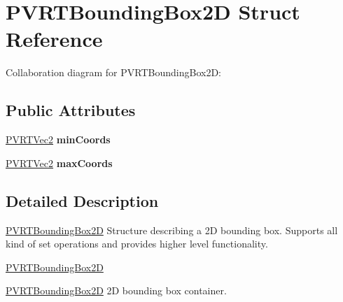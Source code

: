 \hypertarget{struct_p_v_r_t_bounding_box2_d}{\section{P\+V\+R\+T\+Bounding\+Box2\+D Struct Reference}
\label{struct_p_v_r_t_bounding_box2_d}
}


Collaboration diagram for P\+V\+R\+T\+Bounding\+Box2\+D\+:
\subsection*{Public Attributes}
\begin{DoxyCompactItemize}
\item 
\hypertarget{struct_p_v_r_t_bounding_box2_d_a7a058e462e743968bcbf3bc3972a543d}{\hyperlink{struct_p_v_r_t_vec2}{P\+V\+R\+T\+Vec2} {\bfseries min\+Coords}}\label{struct_p_v_r_t_bounding_box2_d_a7a058e462e743968bcbf3bc3972a543d}

\item 
\hypertarget{struct_p_v_r_t_bounding_box2_d_a38baa91edd31d98bab74f310c32f115b}{\hyperlink{struct_p_v_r_t_vec2}{P\+V\+R\+T\+Vec2} {\bfseries max\+Coords}}\label{struct_p_v_r_t_bounding_box2_d_a38baa91edd31d98bab74f310c32f115b}

\end{DoxyCompactItemize}


\subsection{Detailed Description}


  \hyperlink{struct_p_v_r_t_bounding_box2_d}{P\+V\+R\+T\+Bounding\+Box2\+D}  Structure describing a 2\+D bounding box. Supports all kind of set operations and provides higher level functionality.



  \hyperlink{struct_p_v_r_t_bounding_box2_d}{P\+V\+R\+T\+Bounding\+Box2\+D}



  \hyperlink{struct_p_v_r_t_bounding_box2_d}{P\+V\+R\+T\+Bounding\+Box2\+D}  2\+D bounding box container. 


